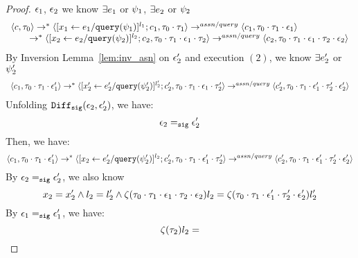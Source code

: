 {\begin{proof}
 $\mathtt{\epsilon}_1$, $\mathtt{\epsilon}_2$ we know $\exists e_1$ or $\psi_1$, $\exists e_2$ or $\psi_2$
\begin{equation}
\label{eq:valdep_inv1}
  \begin{array}{l}   
\langle {c}, \mathtt{\tau}_0 \rangle \rightarrow^{*} 
\langle [\mathrel{ {x}_1 \leftarrow e_1 / {\tt query}(\psi_1) }]^{l_1} ; {c}_1, \mathtt{\tau}_0 \cdot \mathtt{\tau}_1 \rangle  
\rightarrow^{assn/query}
 \langle c_1, \mathtt{\tau}_0 \cdot \mathtt{\tau}_1 \cdot \mathtt{\epsilon}_1 \rangle \\
  \qquad \rightarrow^{*} 
  \langle [\mathrel{ {x}_2 \leftarrow e_2 / {\tt query}(\psi_2) }]^{l_2};{c}_2, 
  \mathtt{\tau}_0 \cdot \mathtt{\tau}_1 \cdot \mathtt{\epsilon}_1 \cdot \mathtt{\tau}_2 \rangle 
  \rightarrow^{assn/query} 
  \langle {c}_2,  \mathtt{\tau}_0 \cdot \mathtt{\tau}_1 \cdot \mathtt{\epsilon}_1 \cdot \mathtt{\tau}_2 \cdot \mathtt{\epsilon}_2 \rangle 
\end{array}
\end{equation}
%
%
By Inversion Lemma~\ref{lem:inv_asn} on 
$\mathtt{\epsilon}_2'$ and execution $(2)$, we know $\exists e_2'$ or $\psi_2'$
 \[
  \begin{array}{l}   
  \langle c_1, \mathtt{\tau}_0 \cdot \mathtt{\tau}_1 \cdot \mathtt{\epsilon}_1' \rangle 
  \rightarrow^{*} 
  \langle [\mathrel{ {x}_2' \leftarrow e_2' / {\tt query}(\psi_2') }]^{l_2'} ; {c}_2', \mathtt{\tau}_0 \cdot \mathtt{\tau}_1 \cdot \mathtt{\epsilon}_1 \cdot \mathtt{\tau}_2' \rangle 
  \rightarrow^{assn/query} 
  \langle {c}_2',  \mathtt{\tau}_0 \cdot \mathtt{\tau}_1 \cdot \mathtt{\epsilon}_1' \cdot \mathtt{\tau}_2' \cdot \mathtt{\epsilon}_2' \rangle 
\end{array}
 \]
%
Unfolding $\mathtt{Diff}_{\mathtt{sig}}(\mathtt{\epsilon}_2,\mathtt{\epsilon}_2')$, we have:
\[
  \mathtt{\epsilon}_2 =_{\mathtt{sig}} \mathtt{\epsilon}_2'
\] 
%
Then, we have:
\begin{equation}
\label{eq:valdep_inv2}
  \langle c_1, \mathtt{\tau}_0 \cdot \mathtt{\tau}_1 \cdot \mathtt{\epsilon}_1' \rangle 
  \rightarrow^{*} 
  \langle [\mathrel{ {x}_2 \leftarrow e_2' / {\tt query}(\psi_2') }]^{l_2} ; {c}_2', \mathtt{\tau}_0 \cdot \mathtt{\tau}_1 \cdot \mathtt{\epsilon}_1' \cdot \mathtt{\tau}_2' \rangle 
  \rightarrow^{assn/query} 
  \langle {c}_2',  \mathtt{\tau}_0 \cdot \mathtt{\tau}_1 \cdot \mathtt{\epsilon}_1' \cdot \mathtt{\tau}_2' \cdot \mathtt{\epsilon}_2' \rangle 
\end{equation}
%
By $\mathtt{\epsilon}_2 =_{\mathtt{sig}} \mathtt{\epsilon}_2'$, we also know
\[
  x_2 = x_2' \land l_2 = l_2' \land 
  \mathtt{\zeta}(\mathtt{\tau}_0 \cdot \mathtt{\tau}_1 \cdot \mathtt{\epsilon}_1 \cdot \mathtt{\tau}_2 \cdot \mathtt{\epsilon}_2) l_2 = 
  \mathtt{\zeta}(\mathtt{\tau}_0 \cdot \mathtt{\tau}_1 \cdot \mathtt{\epsilon}_1' \cdot \mathtt{\tau}_2' \cdot \mathtt{\epsilon}_2') l_2'
\] 
By $\mathtt{\epsilon}_1 =_{\mathtt{sig}} \mathtt{\epsilon}_1'$, we have:
\begin{equation}
\label{eq:valdep_invn}
   \vcounter(\vtrace_2) l_2 = 

\end{equation}
\end{proof}}
